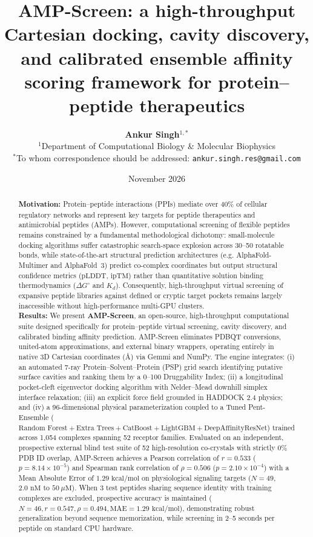 \documentclass[10pt,twocolumn]{article}
\title{\textbf{AMP-Screen: a high-throughput Cartesian docking, cavity discovery, and calibrated ensemble affinity scoring framework for protein--peptide therapeutics}}
\author{
  \textbf{Ankur Singh}$^{1,*}$\\
  \small $^{1}$Department of Computational Biology \& Molecular Biophysics\\
  \small $^*$To whom correspondence should be addressed: \texttt{ankur.singh.res@gmail.com}
}
\date{November 2026}
\begin{document}
\maketitle

\begin{abstract}
\noindent \textbf{Motivation:} Protein--peptide interactions (PPIs) mediate over 40\% of cellular regulatory networks and represent key targets for peptide therapeutics and antimicrobial peptides (AMPs). However, computational screening of flexible peptides remains constrained by a fundamental methodological dichotomy: small-molecule docking algorithms suffer catastrophic search-space explosion across 30--50 rotatable bonds, while state-of-the-art structural prediction architectures (e.g. AlphaFold-Multimer and AlphaFold~3) predict co-complex coordinates but output structural confidence metrics ($\text{pLDDT}$, $\text{ipTM}$) rather than quantitative solution binding thermodynamics ($\Delta G^\circ$ and $K_d$). Consequently, high-throughput virtual screening of expansive peptide libraries against defined or cryptic target pockets remains largely inaccessible without high-performance multi-GPU clusters.\\[4pt]
\noindent \textbf{Results:} We present \textbf{AMP-Screen}, an open-source, high-throughput computational suite designed specifically for protein--peptide virtual screening, cavity discovery, and calibrated binding affinity prediction. AMP-Screen eliminates PDBQT conversions, united-atom approximations, and external binary wrappers, operating entirely in native 3D Cartesian coordinates (\AA) via Gemmi and NumPy. The engine integrates: (i) an automated 7-ray Protein--Solvent--Protein (PSP) grid search identifying putative surface cavities and ranking them by a 0--100 Druggability Index; (ii) a longitudinal pocket-cleft eigenvector docking algorithm with Nelder--Mead downhill simplex interface relaxation; (iii) an explicit force field grounded in HADDOCK 2.4 physics; and (iv) a 96-dimensional physical parameterization coupled to a Tuned Pent-Ensemble ($\text{Random Forest} + \text{Extra Trees} + \text{CatBoost} + \text{LightGBM} + \text{DeepAffinityResNet}$) trained across 1,054 complexes spanning 52 receptor families. Evaluated on an independent, prospective external blind test suite of 52 high-resolution co-crystals with strictly 0\% PDB ID overlap, AMP-Screen achieves a Pearson correlation of $r = 0.533$ ($p = 8.14 \times 10^{-5}$) and Spearman rank correlation of $\rho = 0.506$ ($p = 2.10 \times 10^{-4}$) with a Mean Absolute Error of $1.29\text{ kcal/mol}$ on physiological signaling targets ($N=49$, $2.0\text{ nM}$ to $50\ \mu\text{M}$). When 3 test peptides sharing sequence identity with training complexes are excluded, prospective accuracy is maintained ($N=46, r = 0.547, \rho = 0.494, \text{MAE} = 1.29\text{ kcal/mol}$), demonstrating robust generalization beyond sequence memorization, while screening in 2--5 seconds per peptide on standard CPU hardware.\\[4pt]

\end{abstract}
\end{document}
